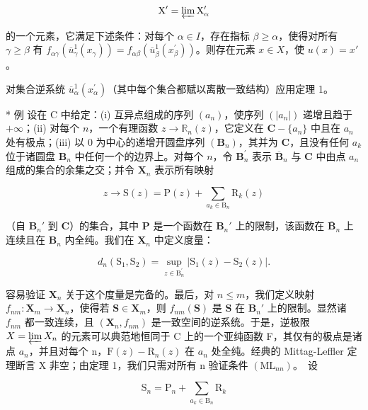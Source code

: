 \[
\mathrm{X} ^ {\prime} = \varprojlim \mathrm{X} _ {\alpha} ^ {\prime}
\]

的一个元素，它满足下述条件：对每个 \(\alpha \in I\)，存在指标 \(\beta \geqslant \alpha\)，使得对所有 \(\gamma \geqslant \beta\) 有 \(f_{\alpha \gamma}(\overline{u}_{\gamma}^{1}(x_{\gamma})) = f_{\alpha \beta}(\overline{u}_{\beta}^{1}(x_{\beta}^{\prime}))\)。则存在元素 \(x \in X\)，使 \(u(x) = x'\)。

对集合逆系统 \(\overline{u}_{\alpha}^{1}(x_{\alpha}^{\prime})\)（其中每个集合都赋以离散一致结构）应用定理 1。

* 例 设在 C 中给定：(i) 互异点组成的序列 \((a_{n})\)，使序列 \((|a_{n}|)\) 递增且趋于 \(+\infty\)；(ii) 对每个 \(n\)，一个有理函数 \(z \to \mathbb{R}_{n}(z)\)，它定义在 \(\mathbf{C} - \{a_{n}\}\) 中且在 \(a_{n}\) 处有极点；(iii) 以 0 为中心的递增开圆盘序列 \((\mathbf{B}_{n})\)，其并为 \(\mathbf{C}\)，且没有任何 \(a_{k}\) 位于诸圆盘 \(\mathbf{B}_{n}\) 中任何一个的边界上。对每个 \(n\)，令 \(\mathbf{B}_{n}^{\prime}\) 表示 \(\overline{\mathbf{B}}_{n}\) 与 \(\mathbf{C}\) 中由点 \(a_{n}\) 组成的集合的余集之交；并令 \(\mathbf{X}_{n}\) 表示所有映射

\[
z \rightarrow \mathrm{S} (z) = \mathrm{P} (z) + \sum_ {a _ {k} \in \mathrm{B} _ {n}} \mathrm{R} _ {k} (z)
\]

（自 \(\mathbf{B}_n'\) 到 \(\mathbf{C}\)）的集合，其中 \(\mathbf{P}\) 是一个函数在 \(\mathbf{B}_n'\) 上的限制，该函数在 \(\overline{\mathbf{B}}_n\) 上连续且在 \(\mathbf{B}_n\) 内全纯。我们在 \(\mathbf{X}_n\) 中定义度量：

\[
d _ {n} \left(\mathrm{S} _ {1}, \mathrm{S} _ {2}\right) = \sup _ {z \in \mathrm{B} _ {n} ^ {\prime}} | \mathrm{S} _ {1} (z) - \mathrm{S} _ {2} (z) |.
\]

容易验证 \(\mathbf{X}_n\) 关于这个度量是完备的。最后，对 \(n \leqslant m\)，我们定义映射 \(f_{nm}: \mathbf{X}_m \to \mathbf{X}_n\)，使得若 \(\mathbf{S} \in \mathbf{X}_m\)，则 \(f_{nm}(\mathbf{S})\) 是 \(\mathbf{S}\) 在 \(\mathbf{B}_n'\) 上的限制。显然诸 \(f_{nm}\) 都一致连续，且 \((\mathbf{X}_n, f_{nm})\) 是一致空间的逆系统。于是，逆极限 \(X = \varprojlim X_{n}\) 的元素可以典范地恒同于 C 上的一个亚纯函数 F，其仅有的极点是诸点 \(a_{n}\)，并且对每个 n，\(\mathrm{F}(z) - \mathrm{R}_{n}(z)\) 在 \(a_{n}\) 处全纯。经典的 Mittag-Leffler 定理断言 X 非空；由定理 1，我们只需对所有 n 验证条件 \((\mathrm{ML}_{nn})\)。~设

\[
\mathrm{S} _ {n} = \mathrm{P} _ {n} + \sum_ {a _ {k} \in \mathrm{B} _ {n}} \mathrm{R} _ {k}
\]

